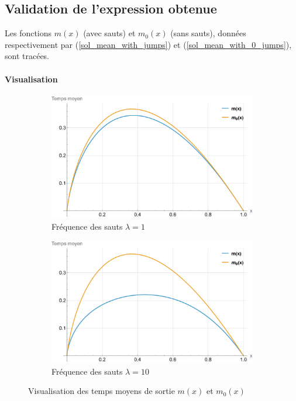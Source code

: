 \subsection{Validation de l'expression obtenue}
Les fonctions \( m(x) \) (avec sauts) et \( m_0(x) \) (sans sauts), données respectivement par (\ref{sol_mean_with_jumps}) et (\ref{sol_mean_with_0_jumps}), sont tracées.
\paragraph{Visualisation}\phantom{}
\begin{figure}[htb]
    \centering
    \begin{subfigure}{0.45\linewidth}
        \includegraphics[width=\linewidth]{img/validation/Jumps/mean_jumps.pdf}
        \caption{Fréquence des sauts $\lambda=1$}
    \end{subfigure}
    \hfill
    \begin{subfigure}{0.45\linewidth}
        \includegraphics[width=\linewidth]{img/validation/Jumps/mean_big_jumps.pdf}
        \caption{Fréquence des sauts $\lambda=10$}
    \end{subfigure}
    \caption{Visualisation des temps moyens de sortie $m(x)$ et $m_0(x)$}\label{fig:JumpsMeanVisualisation}
\end{figure}
